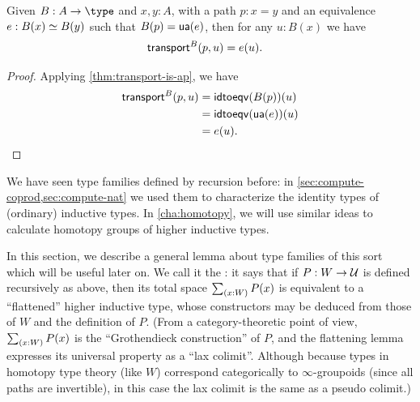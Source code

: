 \begin{lem}\label{thm:transport-is-given}
  Given $B:A\to\type$ and $x,y:A$, with a path $p:x=y$ and an equivalence $e:B(x) \simeq B(y)$ such that ${B}\mathopen{}\left({p}\right)\mathclose{} = \mathsf{ua}(e)$, then for any $u:B(x)$ we have
  \begin{align*}
    \mathsf{transport}^{B}(p,u) &= e(u).
  \end{align*}
\end{lem}
\begin{proof}
  Applying \cref{thm:transport-is-ap}, we have
  \begin{align*}
    \mathsf{transport}^{B}(p,u) &= \mathsf{idtoeqv}({B}\mathopen{}\left({p}\right)\mathclose{})(u)\\
    &= \mathsf{idtoeqv}(\mathsf{ua}(e))(u)\\
    &= e(u).\qedhere
  \end{align*}
\end{proof}

We have seen type families defined by recursion before: in \cref{sec:compute-coprod,sec:compute-nat} we used them to characterize the identity types of (ordinary) inductive types.
In \cref{cha:homotopy}, we will use similar ideas to calculate homotopy groups of higher inductive types.

In this section, we describe a general lemma about type families of this sort which will be useful later on.
We call it the :
%
%
it says that if $P:W\to\mathcal{U}$ is defined recursively as above, then its total space $\sm{x:W} P(x)$ is equivalent to a ``flattened'' higher inductive type, whose constructors may be deduced from those of $W$ and the definition of $P$.
(From a category-theoretic point of view, $\sm{x:W} P(x)$ is the ``Grothendieck construction'' of $P$, and the flattening lemma expresses its universal property as a ``lax colimit''.  Although because types in homotopy type theory (like $W$) correspond categorically to $\infty$-groupoids (since all paths are invertible), in this case the lax colimit is the same as a pseudo colimit.)


